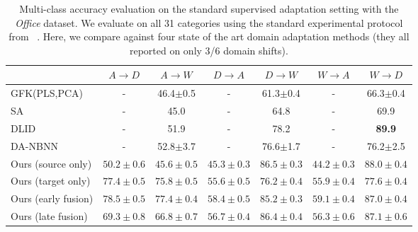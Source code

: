 \begin{table*}
  \setlength{\tabcolsep}{4pt}
  \small
\centering
\begin{tabular}{lcccccc}
\toprule
                     & $A \rightarrow D$   & $A \rightarrow W$   & $D \rightarrow A$   & $D \rightarrow W$   & $W \rightarrow A$   & $W \rightarrow D$   \\
\midrule
GFK(PLS,PCA)~\cite{gong-cvpr12} & - & 46.4$\pm$0.5 & - & 61.3$\pm$0.4 & - & 66.3$\pm$0.4\\
SA~\cite{fernando-iccv13} & - & 45.0 & - & 64.8 & - & 69.9\\
DLID~\cite{ref:dlid} & - & 51.9 & - & 78.2 & - & \bf{89.9}\\     
DA-NBNN~\cite{da-nbnn} & - & 52.8$\pm$3.7 & - & 76.6$\pm$1.7 &           - & 76.2$\pm$2.5\\
\midrule
 Ours (source only)   & $50.2 \pm 0.6$     & $45.6 \pm 0.5$     & $45.3 \pm 0.3$     & $\bm{86.5 \pm 0.3}$     & $44.2 \pm 0.3$     & $88.0 \pm 0.4$     \\
 Ours (target only)   & $77.4 \pm 0.5$     & $75.8 \pm 0.5$     & $55.6 \pm 0.5$     & $76.2 \pm 0.4$     & $55.9 \pm 0.4$     & $77.6 \pm 0.4$     \\
Ours (early fusion)& $\bm{78.5 \pm 0.5}$     & $\bm{77.4 \pm 0.4}$     & $\bm{58.4 \pm 0.5}$     & $85.2 \pm 0.3$     & $\bm{59.1 \pm 0.4}$     & $87.0 \pm 0.4$     \\
Ours (late fusion)& $69.3 \pm 0.8$ & $66.8 \pm 0.7$ & $56.7 \pm 0.4$ & $86.4 \pm 0.4$ & $56.3 \pm 0.6$ & $87.1 \pm 0.6$ \\
\bottomrule
\end{tabular}

\caption{Multi-class accuracy evaluation on the standard supervised adaptation setting with the \emph{Office} dataset. We evaluate on all 31 categories using the standard experimental protocol from ~\cite{saenko-eccv10}. Here, we compare against four state of the art domain adaptation methods (they all reported on only 3/6 domain shifts).}
\label{table:full-semi}
\end{table*}

